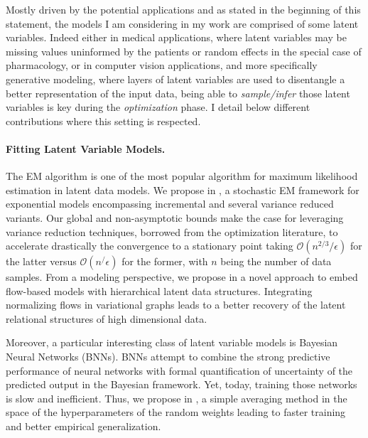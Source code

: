 \documentclass[twoside,11pt]{article}
\begin{document}
\vspace{0.2in}
\textbf{}
\vspace{0.2in}

Mostly driven by the potential applications and as stated in the beginning of this statement, the models I am considering in my work are comprised of some latent variables.
Indeed either in medical applications, where latent variables may be missing values uninformed by the patients or random effects in the special case of pharmacology, or in computer vision applications, and more specifically generative modeling, where layers of latent variables are used to disentangle a better representation of the input data, being able to \emph{sample/infer} those latent variables is key during the \emph{optimization} phase.
I detail below different contributions where this setting is respected.

\vspace{0.08in}
\paragraph{Fitting Latent Variable Models.} 
The EM algorithm is one of the most popular algorithm for maximum likelihood estimation in latent data models.
We propose in \citep{karimi2019global}, a stochastic EM framework for exponential models encompassing incremental and several variance reduced variants.
Our global and non-asymptotic bounds make the case for leveraging variance reduction techniques, borrowed from the optimization literature, to accelerate drastically the convergence to a stationary point taking $\mathcal{O}(n^{2/3}/\epsilon)$ for the latter versus $\mathcal{O}(n^/\epsilon)$ for the former, with $n$ being the number of data samples.
From a modeling perspective, we propose in \citep{ren2020vfg} a novel approach to embed flow-based models with hierarchical latent data structures. 
Integrating normalizing flows in variational graphs leads to a better recovery of the latent relational structures of high dimensional data.

Moreover, a particular interesting class of latent variable models is Bayesian Neural Networks (BNNs).
BNNs attempt to combine the strong predictive performance of neural networks with formal quantification of uncertainty of the predicted output in the Bayesian framework.
Yet, today, training those networks is slow and inefficient. 
Thus, we propose in \citep{karimi2020hwa}, a simple averaging method in the space of the hyperparameters of the random weights leading to faster training and better empirical generalization.
\end{document}
